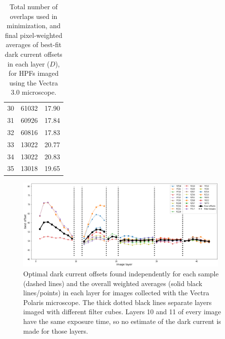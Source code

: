 \documentclass[letterpaper,11pt]{article}
\begin{document}
\begin{table}[!htb]
\begin{tabular}{c c c}
30          & 61032              & 17.90 \\
31          & 60926              & 17.84 \\
32          & 60816              & 17.83 \\
33          & 13022              & 20.77 \\
34          & 13022              & 20.83 \\
35          & 13018              & 19.65 \\
\hline
\end{tabular}
\caption{\footnotesize Total number of overlaps used in minimization, and final pixel-weighted averages of best-fit dark current offsets in each layer ($D$), for HPFs imaged using the Vectra 3.0 microscope.}
\label{tab:best_offsets_vectra}
\end{table}

\begin{figure}[!ht]
\centering
\includegraphics[width=0.95\textwidth]{images/results/dark_current_offsets_polaris}
\caption{\footnotesize Optimal dark current offsets found independently for each sample (dashed lines) and the overall weighted averages (solid black lines/points) in each layer for images collected with the Vectra Polaris microscope. The thick dotted black lines separate layers imaged with different filter cubes. Layers 10 and 11 of every image have the same exposure time, so no estimate of the dark current is made for those layers.}
\label{fig:dark_current_offsets_polaris}
\end{figure}
\end{document}
